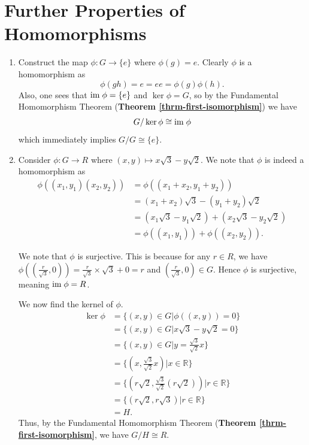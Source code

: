 \section{Further Properties of Homomorphisms}
\begin{enumerate}
    \item Construct the map $\phi: G \to \{e\}$ where $\phi(g) = e$. Clearly $\phi$ is a homomorphism as
    \[
        \phi(gh) = e = ee = \phi(g)\phi(h).
    \]
    Also, one sees that $\mathrm{im}\;\phi = \{e\}$ and $\ker\phi = G$, so by the Fundamental Homomorphism Theorem (\textbf{Theorem \ref{thrm-first-isomorphism}}) we have
    \[
        G / \ker\phi \cong \mathrm{im}\;\phi
    \]
    which immediately implies $G/G \cong \{e\}$.

    \item Consider $\phi: G \to R$ where $(x, y) \mapsto x\sqrt3 - y\sqrt2$. We note that $\phi$ is indeed a homomorphism as
    \begin{align*}
        \phi((x_1,y_1)(x_2,y_2)) &= \phi((x_1+x_2,y_1+y_2))\\
        &= (x_1+x_2)\sqrt3 - (y_1+y_2)\sqrt2\\
        &= (x_1\sqrt3 - y_1\sqrt2) + (x_2\sqrt3 - y_2\sqrt2)\\
        &= \phi((x_1, y_1)) + \phi((x_2, y_2)).
    \end{align*}
    
    We note that $\phi$ is surjective. This is because for any $r \in R$, we have $\phi((\frac{r}{\sqrt3}, 0)) = \frac{r}{\sqrt3} \times \sqrt3 + 0 = r$ and $(\frac{r}{\sqrt3}, 0) \in G$. Hence $\phi$ is surjective, meaning $\mathrm{im}\;\phi = R$.
    
    We now find the kernel of $\phi$.
    \begin{align*}
        \ker\phi &= \{(x, y) \in G \vert \phi((x, y)) = 0\}\\
        &= \{(x, y) \in G \vert x\sqrt3-y\sqrt2 = 0\}\\
        &= \{(x, y) \in G \vert y = \frac{\sqrt{3}}{\sqrt{2}}x\}\\
        &= \{(x, \frac{\sqrt{3}}{\sqrt{2}}x) \vert x \in \mathbb{R}\}\\
        &= \{(r\sqrt2, \frac{\sqrt{3}}{\sqrt{2}}(r\sqrt2)) \vert r \in \mathbb{R}\}\\
        &= \{(r\sqrt2, r\sqrt3) \vert r \in \mathbb{R}\}\\
        &= H.
    \end{align*}
    Thus, by the Fundamental Homomorphism Theorem (\textbf{Theorem \ref{thrm-first-isomorphism}}, we have $G / H \cong R$.


\end{enumerate}

